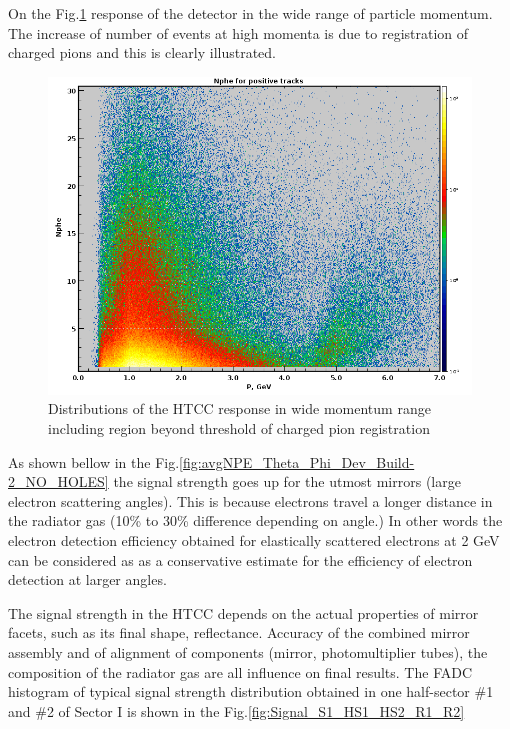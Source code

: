 On the Fig.\ref{fig:positivePNPEC6595} response of the detector in the wide range of particle momentum. The increase of number of events at high momenta is due to registration of charged pions and this is clearly illustrated.

\begin{figure}[!ht]
    \centering
    \includegraphics[width=1.0\linewidth,trim={0.0cm 0.0cm 0.0cm 0.0cm},clip]{images/positivePNPEC6595.png}
    \caption{Distributions of the HTCC response in wide momentum range including region beyond threshold of charged pion registration}
    \label{fig:positivePNPEC6595}
\end{figure}
As shown bellow in the Fig.\ref{fig:avgNPE_Theta_Phi_Dev_Build-2_NO_HOLES} the signal strength goes up for the utmost mirrors (large electron scattering angles). This is because electrons travel a longer distance in the radiator gas (10\% to 30\% difference depending on angle.) In other words the electron detection efficiency obtained for elastically scattered electrons at 2 GeV can be considered as as a conservative estimate for the efficiency of electron detection at larger angles. 

\indent The signal strength in the HTCC depends on the actual properties of mirror facets, such as its final shape, reflectance. Accuracy of the combined mirror assembly and of alignment of components (mirror, photomultiplier tubes), the composition of the radiator gas are all influence on final results. The FADC histogram of  typical signal strength distribution obtained in one half-sector \#1 and \#2 of Sector I is shown in the Fig.\ref{fig:Signal_S1_HS1_HS2_R1_R2}


